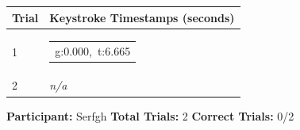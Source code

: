 \documentclass[10pt,a4paper]{article}
\begin{document}
\begin{center}
\begin{tabularx}{\textwidth}{
    C{0.55in}
    X
}
\toprule

\textbf{Trial} &
\textbf{Keystroke Timestamps (seconds)}
\\

\midrule

1 &
\begin{tabular}[t]{@{}l@{}}
g:0.000,\ t:6.665
\end{tabular}
\\[0.12cm]

2 &
\textit{n/a}
\\[0.12cm]

\bottomrule
\end{tabularx}
\end{center}

\vfill


\noindent
\textbf{Participant:} Serfgh
\hfill
\textbf{Total Trials:} 2
\hfill
\textbf{Correct Trials:} 0/2
\end{document}

